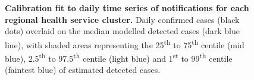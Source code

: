\begin{figure}[ht]
    \caption{\textbf{Calibration fit to daily time series of notifications for each regional health service cluster.} Daily confirmed cases (black dots) overlaid on the median modelled detected cases (dark blue line), with shaded areas representing the 25\textsuperscript{th} to 75\textsuperscript{th} centile (mid blue), 2.5\textsuperscript{th} to 97.5\textsuperscript{th} centile (light blue) and 1\textsuperscript{st} to 99\textsuperscript{th} centile (faintest blue) of estimated detected cases.}
\end{figure}


